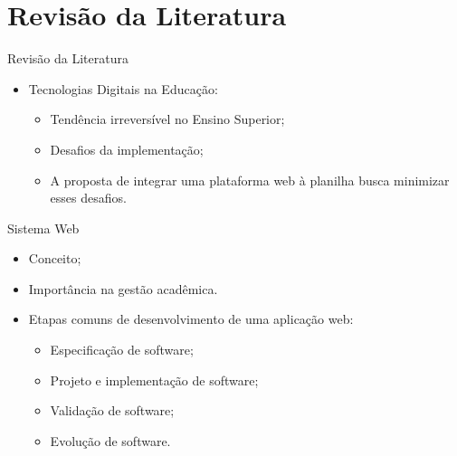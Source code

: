 \section{Revisão da Literatura}

\begin{frame}{Revisão da Literatura}
    \begin{itemize}
        \item Tecnologias Digitais na Educação: \vspace{0.5cm}
              \begin{itemize}
                  \item Tendência irreversível no Ensino Superior; \vspace{0.5cm}
                  \item Desafios da implementação; \vspace{0.5cm}
                  \item A proposta de integrar uma plataforma web à planilha busca minimizar esses desafios. \vspace{0.5cm}
              \end{itemize}
    \end{itemize}
\end{frame}

\begin{frame}{Sistema Web}
    \begin{itemize}
        \item Conceito; \vspace{0.25cm}
        \item Importância na gestão acadêmica. \vspace{0.25cm}
        \item Etapas comuns de desenvolvimento de uma aplicação web: \vspace{0.25cm}
              \begin{itemize}
                  \item Especificação de software; \vspace{0.25cm}
                  \item Projeto e implementação de software; \vspace{0.25cm}
                  \item Validação de software; \vspace{0.25cm}
                  \item Evolução de software. \vspace{0.25cm}
              \end{itemize}
    \end{itemize}
\end{frame}

